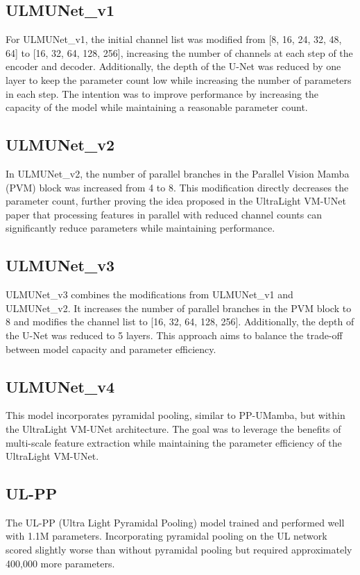 \documentclass[conference]{IEEEtran}
\begin{document}
\subsection{ULMUNet\_v1}
For ULMUNet\_v1, the initial channel list was modified from [8, 16, 24, 32, 48, 64] to [16, 32, 64, 128, 256], increasing the number of channels at each step of the encoder and decoder. Additionally, the depth of the U-Net was reduced by one layer to keep the parameter count low while increasing the number of parameters in each step. The intention was to improve performance by increasing the capacity of the model while maintaining a reasonable parameter count.

\subsection{ULMUNet\_v2}
In ULMUNet\_v2, the number of parallel branches in the Parallel Vision Mamba (PVM) block was increased from 4 to 8. This modification directly decreases the parameter count, further proving the idea proposed in the UltraLight VM-UNet paper \cite{ultralightvmunet} that processing features in parallel with reduced channel counts can significantly reduce parameters while maintaining performance.

\subsection{ULMUNet\_v3}
ULMUNet\_v3 combines the modifications from ULMUNet\_v1 and ULMUNet\_v2. It increases the number of parallel branches in the PVM block to 8 and modifies the channel list to [16, 32, 64, 128, 256]. Additionally, the depth of the U-Net was reduced to 5 layers. This approach aims to balance the trade-off between model capacity and parameter efficiency.

\subsection{ULMUNet\_v4}
This model incorporates pyramidal pooling, similar to PP-UMamba, but within the UltraLight VM-UNet architecture. The goal was to leverage the benefits of multi-scale feature extraction while maintaining the parameter efficiency of the UltraLight VM-UNet.

\subsection{UL-PP}
The UL-PP (Ultra Light Pyramidal Pooling) model trained and performed well with 1.1M parameters. Incorporating pyramidal pooling on the UL network scored slightly worse than without pyramidal pooling but required approximately 400,000 more parameters.
\end{document}
